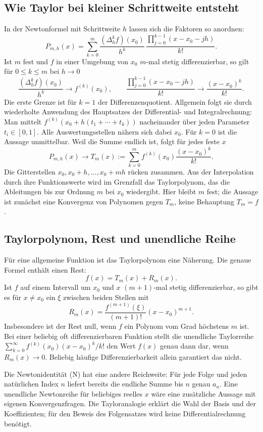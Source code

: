\subsection*{Wie Taylor bei kleiner Schrittweite entsteht}

In der Newtonformel mit Schrittweite $h$ lassen sich die Faktoren so
anordnen:
\[
 P_{m,h}(x)=\sum_{k=0}^m
 \frac{(\Delta_h^kf)(x_0)}{h^k}\,
 \frac{\prod_{j=0}^{k-1}(x-x_0-jh)}{k!}.
\]
Ist $m$ fest und $f$ in einer Umgebung von $x_0$ $m$-mal stetig
differenzierbar, so gilt für $0\leq k\leq m$ bei $h\to0$
\[
 \frac{(\Delta_h^kf)(x_0)}{h^k}\longrightarrow f^{(k)}(x_0),
 \qquad
 \frac{\prod_{j=0}^{k-1}(x-x_0-jh)}{k!}
 \longrightarrow\frac{(x-x_0)^k}{k!}.
\]
Die erste Grenze ist für $k=1$ der Differenzenquotient. Allgemein
folgt sie durch wiederholte Anwendung des Hauptsatzes der
Differential- und Integralrechnung: Man mittelt
$f^{(k)}(x_0+h(t_1+\cdots+t_k))$ nacheinander über jeden Parameter
$t_i\in[0,1]$. Alle Auswertungsstellen nähern sich dabei $x_0$.
Für $k=0$ ist die Aussage unmittelbar.
Weil die Summe endlich ist, folgt für jedes feste $x$
\[
 P_{m,h}(x)\longrightarrow
 T_m(x):=\sum_{k=0}^m f^{(k)}(x_0)\frac{(x-x_0)^k}{k!}.
\]
Die Gitterstellen $x_0,x_0+h,\ldots,x_0+mh$ rücken zusammen.
Aus der Interpolation durch ihre Funktionswerte wird im Grenzfall das
Taylorpolynom, das die Ableitungen bis zur Ordnung $m$ bei $x_0$
wiedergibt. Hier bleibt $m$ fest; die Aussage ist zunächst eine
Konvergenz von Polynomen gegen $T_m$, keine Behauptung $T_m=f$.

\subsection*{Taylorpolynom, Rest und unendliche Reihe}

Für eine allgemeine Funktion ist das Taylorpolynom eine Näherung.
Die genaue Formel enthält einen Rest:
\[
 f(x)=T_m(x)+R_m(x).
\]
Ist $f$ auf einem Intervall um $x_0$ und $x$ $(m+1)$-mal stetig
differenzierbar, so gibt es für $x\ne x_0$ ein $\xi$ zwischen beiden
Stellen mit
\[
 R_m(x)=\frac{f^{(m+1)}(\xi)}{(m+1)!}(x-x_0)^{m+1}.
\]
Insbesondere ist der Rest null, wenn $f$ ein Polynom vom Grad höchstens
$m$ ist. Bei einer beliebig oft differenzierbaren Funktion stellt die
unendliche Taylorreihe $\sum_{k=0}^{\infty}
f^{(k)}(x_0)(x-x_0)^k/k!$ den Wert $f(x)$ genau dann dar, wenn
$R_m(x)\to0$. Beliebig häufige Differenzierbarkeit allein garantiert
das nicht.

Die Newtonidentität (N) hat eine andere Reichweite: Für jede Folge und
jeden natürlichen Index $n$ liefert bereits die endliche Summe bis
$n$ genau $a_n$. Eine unendliche Newtonreihe für beliebiges reelles $x$
wäre eine zusätzliche Aussage mit eigenen Konvergenzfragen.
Die Tayloranalogie erklärt die Wahl der Basis und der Koeffizienten;
für den Beweis des Folgensatzes wird keine Differentialrechnung benötigt.

